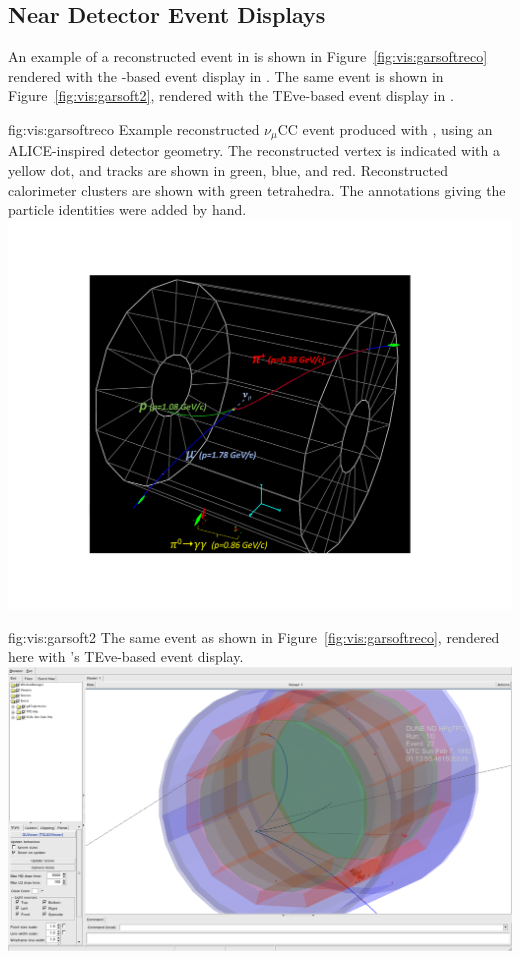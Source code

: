 \documentclass[../main-v1.tex]{subfiles}
\begin{document}
\subsection{Near Detector Event Displays}
\label{sec:visualization:neardetector}


An example of a reconstructed event in  is shown in Figure~\ref{fig:vis:garsoftreco} rendered with the -based event display in .  The same event is shown in Figure~\ref{fig:vis:garsoft2}, rendered with the TEve-based event display in .

\begin{dunefigure}
{fig:vis:garsoftreco} 
{Example reconstructed $\nu_\mu$CC event produced with , using an ALICE-inspired detector geometry.  The reconstructed vertex is indicated with a yellow dot, and tracks are shown in green, blue, and red.  Reconstructed calorimeter clusters are shown with green tetrahedra.  The annotations giving the  particle identities were added by hand.}
\includegraphics[width=0.9 \textwidth]{graphics/EventDisplays/nd_gar_evdwp2_withcaloclusters.pdf}
\end{dunefigure}

\begin{dunefigure}
{fig:vis:garsoft2} 
{The same  event as shown in Figure~\ref{fig:vis:garsoftreco}, rendered here with  's TEve-based event display.}
\includegraphics[width=0.9 \textwidth]{graphics/EventDisplays/ndgar_evd3d.png}
\end{dunefigure}
\end{document}
